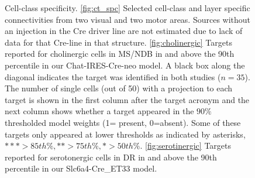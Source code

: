 \newpage

\begin{figure}[H]
    \newline
    \caption{  Cell-class specificity. \ref{fig:ct_spc} Selected cell-class and layer specific connectivities from two visual and two motor areas.
	 Sources without an injection in the Cre driver line are not estimated due to lack of data for that Cre-line in that structure.
	 \ref{fig:cholinergic} Targets reported for cholinergic cells in MS/NDB in \citet{ Li2018-nu}  and above the 90th percentile in our Chat-IRES-Cre-neo model.  A black box along the diagonal indicates the target was identified in both studies ($n=35$). The number of single cells (out of 50) with a projection to each target is shown in the first column after the target acronym and the next column shows whether a target appeared in the $90\%$ thresholded model weights (1= present, 0=absent). Some of these targets only appeared at lower thresholds as indicated by asterisks, $*** >85th \%, ** >75th \%, * >50th \%$.
\ref{fig:serotinergic} Targets reported for serotonergic cells in DR in \citet{Ren2018-ty, Ren2019-jg} and above the 90th percentile in our Slc6a4-Cre\_ET33 model.
    		}
\label{fig:data_ct}
\end{figure}

